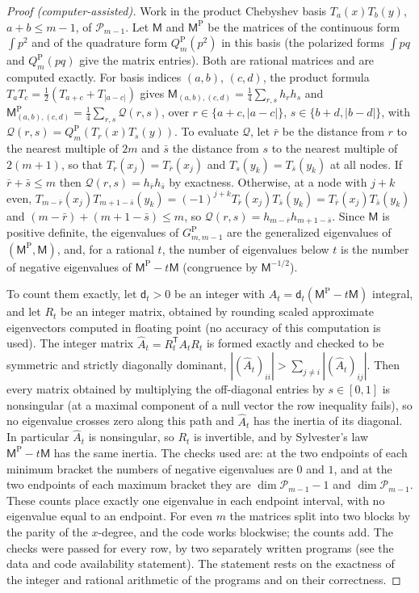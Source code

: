 \documentclass[preprint,12pt,a4paper]{elsarticle}
\theoremstyle{remark}
\newcommand{\Pa}{\mathrm P}
\begin{document}
\begin{proof}[Proof (computer-assisted)]
Work in the product Chebyshev basis $T_a(x)T_b(y)$, $a+b\le m-1$, of
$\mathcal P_{m-1}$. Let $\mathsf M$ and $\mathsf M^{\mathrm P}$ be the matrices of the
continuous form $\int p^2$ and of the quadrature form $Q_m^\Pa(p^2)$ in this
basis (the polarized forms $\int pq$ and $Q_m^\Pa(pq)$ give the matrix entries).
Both are rational matrices and are computed exactly. For basis indices $(a,b)$,
$(c,d)$, the product formula $T_aT_c=\frac12(T_{a+c}+T_{|a-c|})$ gives
$\mathsf M_{(a,b),(c,d)}=\frac14\sum_{r,s}h_rh_s$ and
$\mathsf M^{\mathrm P}_{(a,b),(c,d)}=\frac14\sum_{r,s}\mathcal Q(r,s)$, over
$r\in\{a+c,|a-c|\}$, $s\in\{b+d,|b-d|\}$, with $\mathcal Q(r,s)=Q_m^\Pa(T_r(x)T_s(y))$.
To evaluate $\mathcal Q$, let $\bar r$ be the distance from $r$ to the nearest multiple
of $2m$ and $\bar s$ the distance from $s$ to the nearest multiple of $2(m+1)$, so
that $T_r(x_j)=T_{\bar r}(x_j)$ and $T_s(y_k)=T_{\bar s}(y_k)$ at all nodes. If
$\bar r+\bar s\le m$ then $\mathcal Q(r,s)=h_{\bar r}h_{\bar s}$ by exactness.
Otherwise, at a node with $j+k$ even,
$T_{m-\bar r}(x_j)T_{m+1-\bar s}(y_k)=(-1)^{j+k}T_{\bar r}(x_j)T_{\bar s}(y_k)=T_{\bar r}(x_j)T_{\bar s}(y_k)$ and
$(m-\bar r)+(m+1-\bar s)\le m$, so $\mathcal Q(r,s)=h_{m-\bar r}h_{m+1-\bar s}$.
Since $\mathsf M$ is positive definite, the eigenvalues of $G^\Pa_{m,m-1}$ are the
generalized eigenvalues of $(\mathsf M^{\mathrm P},\mathsf M)$, and, for a rational $t$, the number of
eigenvalues below $t$ is the number of negative eigenvalues of
$\mathsf M^{\mathrm P}-t\mathsf M$ (congruence by $\mathsf M^{-1/2}$).

To count them exactly, let $\mathsf d_t>0$ be an integer with
$A_t=\mathsf d_t(\mathsf M^{\mathrm P}-t\mathsf M)$ integral,
and let $R_t$ be an integer matrix, obtained by rounding scaled approximate
eigenvectors computed in floating point (no accuracy of this computation is
used). The integer matrix $\widehat A_t=R_t^{\mathsf T}A_tR_t$ is formed exactly and
checked to be symmetric and strictly diagonally dominant,
$|(\widehat A_t)_{ii}|>\sum_{j\ne i}|(\widehat A_t)_{ij}|$.
Then every matrix obtained by multiplying the off-diagonal entries by
$s\in[0,1]$ is nonsingular (at a maximal component of a null vector the row
inequality fails), so no eigenvalue crosses zero along this path and $\widehat A_t$ has
the inertia of its diagonal. In particular $\widehat A_t$ is nonsingular, so $R_t$ is
invertible, and by Sylvester's law $\mathsf M^{\mathrm P}-t\mathsf M$ has the same inertia. The
checks used are: at the two endpoints of each minimum bracket the numbers of
negative eigenvalues are $0$ and $1$, and at the two endpoints of each maximum
bracket they are $\dim\mathcal P_{m-1}-1$ and $\dim\mathcal P_{m-1}$. These counts
place exactly one eigenvalue in each endpoint interval, with no eigenvalue equal
to an endpoint. For even $m$ the matrices split into two blocks by the parity of the
$x$-degree, and the code works blockwise; the counts add. The checks were passed for every row, by two
separately written programs (see the data and code availability statement). The statement rests on the
exactness of the integer and rational arithmetic of the programs and on their
correctness.
\end{proof}
\end{document}

